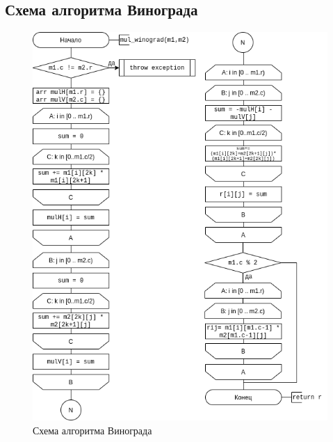 \newpage
\subsection{Схема алгоритма Винограда}

\begin{figure}[h!]
    \centering
    \includegraphics[width=1\textwidth]{2/inc/d2.png}
    \caption{Схема алгоритма Винограда}
    \label{fig:2.2}
\end{figure}

